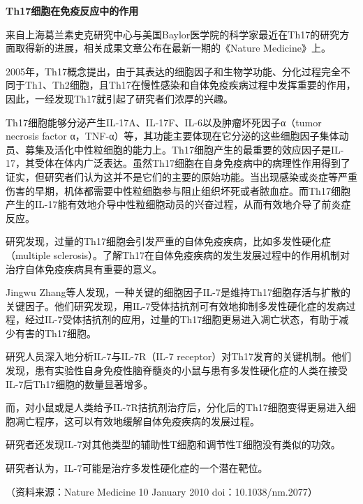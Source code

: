 \begin{center}
\textbf{\Large Th17细胞在免疫反应中的作用}
\end{center}

来自上海葛兰素史克研究中心与美国Baylor医学院的科学家最近在Th17的研究方面取得新的进展，相关成果文章公布在最新一期的《Nature
Medicine》上。

2005年，Th17概念提出，由于其表达的细胞因子和生物学功能、分化过程完全不同于Th1、Th2细胞，且Th17在慢性感染和自体免疫疾病过程中发挥重要的作用，因此，一经发现Th17就引起了研究者们浓厚的兴趣。

Th17细胞能够分泌产生IL-17A、IL-17F、IL-6以及肿瘤坏死因子α（tumor
necrosis factor
α，TNF-α）等，其功能主要体现在它分泌的这些细胞因子集体动员、募集及活化中性粒细胞的能力上。Th17细胞产生的最重要的效应因子是IL-17，其受体在体内广泛表达。虽然Th17细胞在自身免疫病中的病理性作用得到了证实，但研究者们认为这并不是它们的主要的原始功能。当出现感染或炎症等严重伤害的早期，机体都需要中性粒细胞参与阻止组织坏死或者脓血症。而Th17细胞产生的IL-17能有效地介导中性粒细胞动员的兴奋过程，从而有效地介导了前炎症反应。

研究发现，过量的Th17细胞会引发严重的自体免疫疾病，比如多发性硬化症（multiple
sclerosis）。了解Th17在自体免疫疾病的发生发展过程中的作用机制对治疗自体免疫疾病具有重要的意义。

Jingwu
Zhang等人发现，一种关键的细胞因子IL-7是维持Th17细胞存活与扩散的关键因子。他们研究发现，用IL-7受体拮抗剂可有效地抑制多发性硬化症的发病过程，经过IL-7受体拮抗剂的应用，过量的Th17细胞更易进入凋亡状态，有助于减少有害的Th17细胞。

研究人员深入地分析IL-7与IL-7R（IL-7
receptor）对Th17发育的关键机制。他们发现，患有实验性自身免疫性脑脊髓炎的小鼠与患有多发性硬化症的人类在接受IL-7后Th17细胞的数量显著增多。

而，对小鼠或是人类给予IL-7R拮抗剂治疗后，分化后的Th17细胞变得更易进入细胞凋亡程序，这可以有效地缓解自体免疫疾病的发展过程。

研究者还发现IL-7对其他类型的辅助性T细胞和调节性T细胞没有类似的功效。

研究者认为，IL-7可能是治疗多发性硬化症的一个潜在靶位。

（资料来源：Nature Medicine 10 January 2010 \textbar{}
doi：10.1038/nm.2077）

